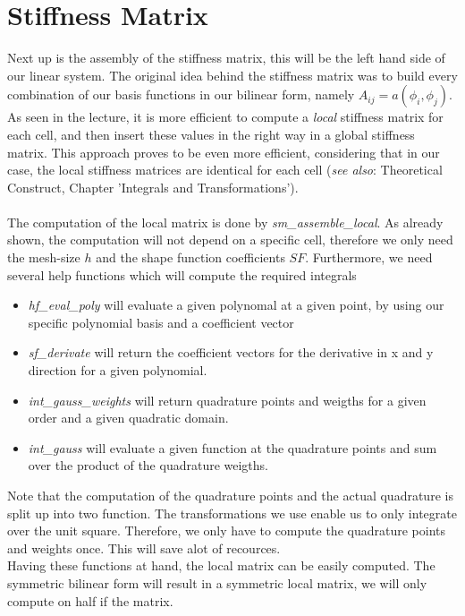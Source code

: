 \documentclass[a4paper,12pt]{article}
\begin{document}
\section{Stiffness Matrix}
Next up is the assembly of the stiffness matrix, this will be the left hand side of our linear system. The original idea behind the stiffness matrix was to build every combination of our basis functions in our bilinear form, namely $A_{ij}=a(\phi_i,\phi_j)$. As seen in the lecture, it is more efficient to compute a \textit{local} stiffness matrix for each cell, and then insert these values in the right way in a global stiffness matrix. This approach proves to be even more efficient, considering that in our case, the local stiffness matrices are identical for each cell (\textit{see also}: Theoretical Construct, Chapter 'Integrals and Transformations').\\
\\
The computation of the local matrix is done by \textit{sm\_assemble\_local}. As already shown, the computation will not depend on a specific cell, therefore we only need the mesh-size $h$ and the shape function coefficients $SF$. Furthermore, we need several help functions which will compute the required integrals
\begin{itemize}
\item \textit{hf\_eval\_poly} will evaluate a given polynomal at a given point, by using our specific polynomial basis and a coefficient vector
\item \textit{sf\_derivate} will return the coefficient vectors for the derivative in x and y direction for a given polynomial. 
\item \textit{int\_gauss\_weights} will return quadrature points and weigths for a given order and a given quadratic domain.
\item \textit{int\_gauss} will evaluate a given function at the quadrature points and sum over the product of the quadrature weigths. 
\end{itemize} 
Note that the computation of the quadrature points and the actual quadrature is split up into two function. The transformations we use enable us to only integrate over the unit square. Therefore, we only have to compute the quadrature points and weights once. This will save alot of recources.\\
Having these functions at hand, the local matrix can be easily computed. The symmetric bilinear form will result in a symmetric local matrix, we will only compute on half if the matrix.\\
\end{document}
